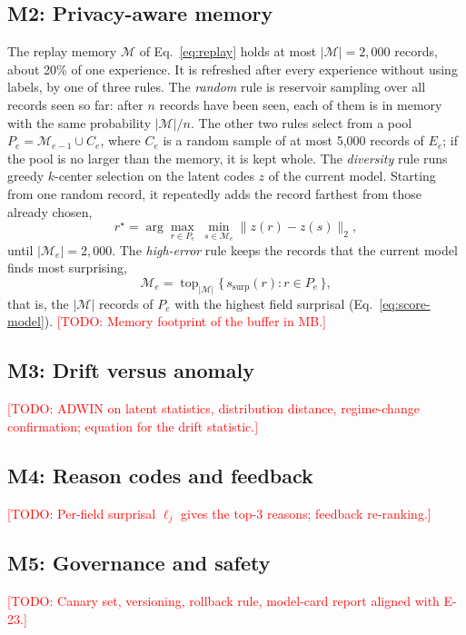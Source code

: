 \documentclass{article} %
\newcommand{\todo}[1]{\textcolor{red}{[TODO: #1]}}
\begin{document}
\subsection{M2: Privacy-aware memory}\label{sec:m2}
The replay memory $\mathcal{M}$ of Eq.~\eqref{eq:replay} holds at most
$|\mathcal{M}| = 2{,}000$ records, about 20\% of one experience. It is refreshed
after every experience without using labels, by one of three rules. The
\emph{random} rule is reservoir sampling over all records seen so far: after
$n$ records have been seen, each of them is in memory with the same probability
$|\mathcal{M}|/n$. The other two rules select from a pool
$P_e = \mathcal{M}_{e-1}\cup C_e$, where $C_e$ is a random sample of at most
5{,}000 records of $E_e$; if the pool is no larger than the memory, it is kept
whole. The \emph{diversity} rule runs greedy $k$-center selection on the latent
codes $z$ of the current model. Starting from one random record, it repeatedly
adds the record farthest from those already chosen,
\begin{equation}
r^{\star} = \arg\max_{r\in P_e}\ \min_{s\in\mathcal{M}_e} \lVert z(r) - z(s)\rVert_2,
\label{eq:kcenter}
\end{equation}
until $|\mathcal{M}_e| = 2{,}000$. The \emph{high-error} rule keeps the records
that the current model finds most surprising,
\begin{equation}
\mathcal{M}_e = \operatorname{top}_{|\mathcal{M}|}\bigl\{\, s_{\text{surp}}(r) : r\in P_e \,\bigr\},
\label{eq:higherror}
\end{equation}
that is, the $|\mathcal{M}|$ records of $P_e$ with the highest field surprisal
(Eq.~\eqref{eq:score-model}).
\todo{Memory footprint of the buffer in MB.}
\subsection{M3: Drift versus anomaly}
\todo{ADWIN on latent statistics, distribution distance, regime-change confirmation;
equation for the drift statistic.}
\subsection{M4: Reason codes and feedback}\label{sec:m4}
\todo{Per-field surprisal $\ell_j$ gives the top-3 reasons; feedback re-ranking.}
\subsection{M5: Governance and safety}
\todo{Canary set, versioning, rollback rule, model-card report \citep{mitchell2019model} aligned with E-23.}
\end{document}
